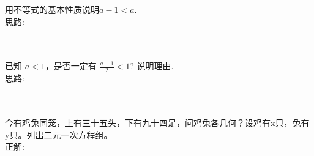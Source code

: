 \item {
    用不等式的基本性质说明$a-1<a$.
    \ifshowSolution
        \fangsong{}
        \\
        思路:
    \else
        \\ \\ \\
    \fi
}

\item {
    已知 $a<1$，是否一定有 $\frac{a+1}{2}<1$? 说明理由.
    \ifshowSolution
        \fangsong{}
        \\
        思路:
    \else
        \\ \\ \\
    \fi
}


\item {
    今有鸡兔同笼，上有三十五头，下有九十四足，问鸡兔各几何？设鸡有x只，兔有y只。列出二元一次方程组。
    \ifshowSolution
        \fangsong{}
        \\
        正解: 
    \else
        \\ \\ \\
    \fi
}